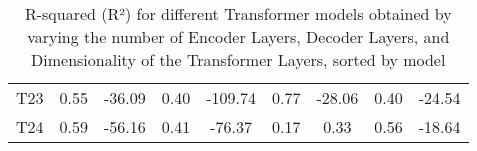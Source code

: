 \begin{table}[]
{\begin{tabular}{ccccccccc}
    T23   & \cellcolor[HTML]{FEE082}0.55 & \cellcolor[HTML]{FDD880}-36.09  & \cellcolor[HTML]{D1DE82}0.40 & \cellcolor[HTML]{FCB97A}-109.74 & \cellcolor[HTML]{76C47D}0.77  & \cellcolor[HTML]{FA9072}-28.06 & \cellcolor[HTML]{FCB77A}0.40 & \cellcolor[HTML]{FCC17C}-24.54 \\
    T24   & \cellcolor[HTML]{FEEA83}0.59 & \cellcolor[HTML]{FCBE7B}-56.16  & \cellcolor[HTML]{C2DA81}0.41 & \cellcolor[HTML]{FDCC7E}-76.37  & \cellcolor[HTML]{ECE683}0.17  & \cellcolor[HTML]{63BE7B}0.33   & \cellcolor[HTML]{FEDF81}0.56 & \cellcolor[HTML]{FDD17F}-18.64
    \end{tabular}%
    }
    \caption{R-squared (R²) for different Transformer models obtained by varying the number of Encoder Layers, Decoder Layers, and Dimensionality of the Transformer Layers, sorted by model}
    \label{T4_R}
    \end{table}


